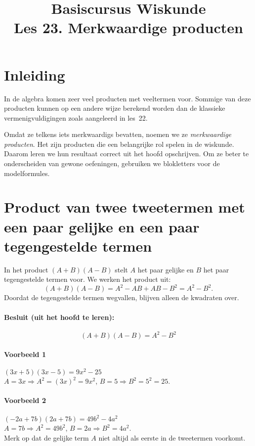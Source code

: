 \documentclass[a4paper,12pt]{article}
\title{Basiscursus Wiskunde\\\large Les 23. Merkwaardige producten}
\date{}
\author{}
\begin{document}
\maketitle

\section*{Inleiding}
In de algebra komen zeer veel producten met veeltermen voor. Sommige van deze producten kunnen op een andere wijze berekend worden dan de klassieke vermenigvuldigingen zoals aangeleerd in les~22.

Omdat ze telkens iets merkwaardigs bevatten, noemen we ze \emph{merkwaardige producten}. Het zijn producten die een belangrijke rol spelen in de wiskunde. Daarom leren we hun resultaat correct uit het hoofd opschrijven. Om ze beter te onderscheiden van gewone oefeningen, gebruiken we blokletters voor de modelformules.

\section{Product van twee tweetermen met een paar gelijke en een paar tegengestelde termen}
In het product \((A+B)(A-B)\) stelt \(A\) het paar gelijke en \(B\) het paar tegengestelde termen voor. We werken het product uit:
\[
(A+B)(A-B)=A^2-AB+AB-B^2=A^2-B^2.
\]
Doordat de tegengestelde termen wegvallen, blijven alleen de kwadraten over.

\paragraph*{Besluit (uit het hoofd te leren):}
\[
\boxed{(A+B)(A-B)=A^2-B^2}
\]

\paragraph*{Voorbeeld 1}
\((3x+5)(3x-5)=9x^2-25\)\\
\(A=3x\Rightarrow A^2=(3x)^2=9x^2\), \quad \(B=5\Rightarrow B^2=5^2=25\).

\paragraph*{Voorbeeld 2}
\(({-}2a+7b)(2a+7b)=49b^2-4a^2\)\\
\(A=7b\Rightarrow A^2=49b^2\), \quad \(B=2a\Rightarrow B^2=4a^2\).\\
Merk op dat de gelijke term \(A\) niet altijd als eerste in de tweetermen voorkomt.
\end{document}
